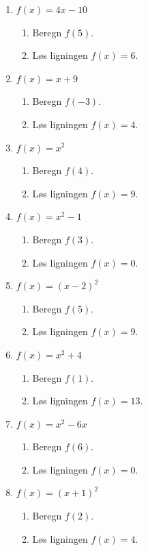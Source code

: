 \documentclass[10pt,a4paper,table]{article}
\begin{document}
\begin{enumerate}
  \item $f(x) = 4x - 10$
  \begin{enumerate}
    \item Beregn $f(5)$.
    \item Løs ligningen $f(x)=6$.
  \end{enumerate}

  \item $f(x) = x + 9$
  \begin{enumerate}
    \item Beregn $f(-3)$.
    \item Løs ligningen $f(x)=4$.
  \end{enumerate}

  \item $f(x) = x^2$
  \begin{enumerate}
    \item Beregn $f(4)$.
    \item Løs ligningen $f(x)=9$.
  \end{enumerate}

  \item $f(x) = x^2 - 1$
  \begin{enumerate}
    \item Beregn $f(3)$.
    \item Løs ligningen $f(x)=0$.
  \end{enumerate}

  \item $f(x) = (x-2)^2$
  \begin{enumerate}
    \item Beregn $f(5)$.
    \item Løs ligningen $f(x)=9$.
  \end{enumerate}

  \item $f(x) = x^2 + 4$
  \begin{enumerate}
    \item Beregn $f(1)$.
    \item Løs ligningen $f(x)=13$.
  \end{enumerate}

  \item $f(x) = x^2 - 6x$
  \begin{enumerate}
    \item Beregn $f(6)$.
    \item Løs ligningen $f(x)=0$.
  \end{enumerate}

  \item $f(x) = (x+1)^2$
  \begin{enumerate}
    \item Beregn $f(2)$.
    \item Løs ligningen $f(x)=4$.
  \end{enumerate}


\end{enumerate}
\end{document}
